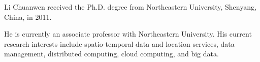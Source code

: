 \documentclass[10pt,journal,compsoc]{IEEEtran}
\begin{document}
	
	\begin{IEEEbiography}{Li Chuanwen}
		received the Ph.D. degree from Northeastern University, Shenyang, China, in 2011.
		
		He is currently an associate professor with Northeastern University. His current research interests include spatio-temporal data and location services, data management, distributed computing, cloud computing, and big data.
	\end{IEEEbiography}
	
	
	
	
	
	
	
	
\end{document}
